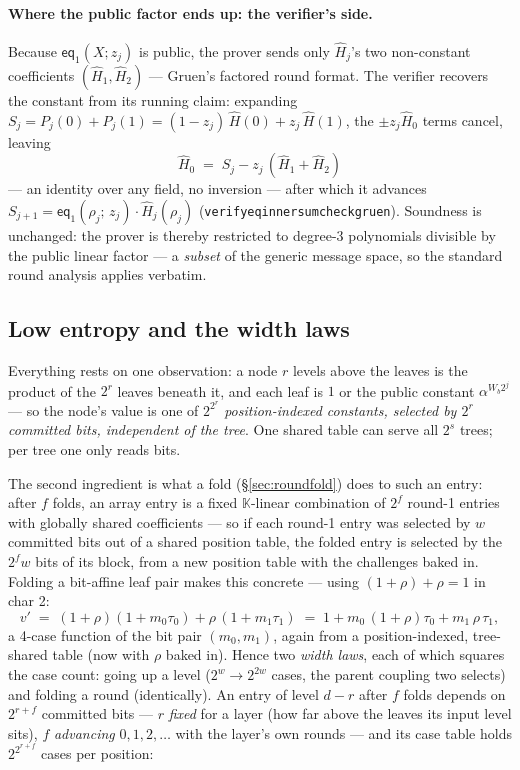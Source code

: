 \documentclass[11pt]{article}
\newcommand{\K}{\mathbb{K}}            %
\newcommand{\eq}{\mathsf{eq}}
\newcommand{\code}[1]{{\def\_{\textunderscore\allowbreak}\texttt{#1}}}
\theoremstyle{definition}
\begin{document}
\paragraph{Where the public factor ends up: the verifier's side.}
Because $\eq_1(X; z_j)$ is public, the prover sends only
$\hat H_j$'s two non-constant coefficients $(\hat H_1, \hat H_2)$ ---
Gruen's factored round format.  The verifier recovers the constant
from its running claim: expanding
$S_j = P_j(0) + P_j(1) = (1{-}z_j)\,\hat H(0) + z_j\,\hat H(1)$, the
$\pm z_j \hat H_0$ terms cancel, leaving
\[
  \hat H_0 \;=\; S_j - z_j\,(\hat H_1 + \hat H_2)
\]
--- an identity over any field, no inversion --- after which it
advances $S_{j+1} = \eq_1(\rho_j;\, z_j)\cdot\hat H_j(\rho_j)$
(\code{verify\_eq\_inner\_sumcheck\_gruen}).  Soundness is unchanged:
the prover is thereby restricted to degree-3 polynomials divisible by
the public linear factor --- a \emph{subset} of the generic message
space, so the standard round analysis applies verbatim.

\subsection{Low entropy and the width laws}
\label{sec:width}

Everything rests on one observation: a node $r$ levels above the leaves
is the product of the $2^r$ leaves beneath it, and each leaf is $1$ or
the public constant $\alpha^{W_b 2^j}$ --- so the node's value is one of
$2^{2^r}$ \emph{position-indexed constants, selected by $2^r$ committed
bits, independent of the tree}.  One shared table can serve all $2^s$
trees; per tree one only reads bits.

The second ingredient is what a fold (\S\ref{sec:roundfold}) does to
such an entry: after $f$ folds, an array entry is a fixed $\K$-linear
combination of $2^f$ round-1 entries with globally shared coefficients
--- so if each round-1 entry was selected by $w$ committed bits out of a
shared position table, the folded entry is selected by the $2^f w$ bits
of its block, from a new position table with the challenges baked in.
Folding a bit-affine leaf pair makes this concrete --- using
$(1{+}\rho) + \rho = 1$ in char 2:
\begin{equation}\label{eq:fold}
  v' \;=\; (1{+}\rho)(1 + m_0\tau_0) + \rho\,(1 + m_1\tau_1)
      \;=\; 1 + m_0\,(1{+}\rho)\tau_0 + m_1\,\rho\,\tau_1 ,
\end{equation}
a 4-case function of the bit pair $(m_0, m_1)$, again from a
position-indexed, tree-shared table (now with $\rho$ baked in).  Hence
two \emph{width laws}, each of which squares the case count: going up a
level ($2^w \to 2^{2w}$ cases, the parent coupling two selects) and
folding a round (identically).  An entry of level $d - r$ after $f$
folds depends on $2^{r+f}$ committed bits --- $r$ \emph{fixed} for a
layer (how far above the leaves its input level sits), $f$
\emph{advancing} $0, 1, 2, \dots$ with the layer's own rounds --- and
its case table holds
$2^{2^{r+f}}$ cases per position:
\end{document}
